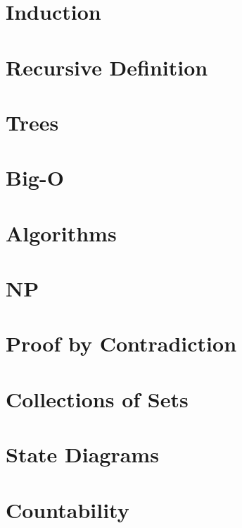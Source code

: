 \documentclass{article}
\begin{document}
\section{Induction}


\section{Recursive Definition}


\section{Trees}


\section{Big-O}


\section{Algorithms}


\section{NP}


\section{Proof by Contradiction}


\section{Collections of Sets}


\section{State Diagrams}


\section{Countability}

\end{document}
